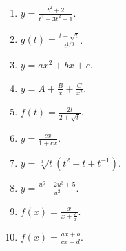\begin{problem}
\begin{multicols}{3}
\begin{enumerate}
\item $y=\frac{t^2+2}{t^4-3t^2+1}$.
\item $g(t)=\frac{t-\sqrt{t}}{t^{1/3}}$.
\item $y=a x^2+b x + c$.
\item $y=A+\frac{B}x +\frac{C}{x^2}$.
\item $f(t)=\frac{2t}{2+\sqrt{t}}$.
\item $y=\frac{c x}{1+c x}$.
\item $y=\sqrt[3]{t}(t^2+t+t^{-1}) $.
\item $y=\frac{u^6-2u^3+5}{u^2}$.
\item $f(x)=\frac{x}{x+\frac{c}{x}}$.
\item $f(x)=\frac{a x+b}{c x+ d}$.
\end{enumerate}
\end{multicols}
\end{problem}